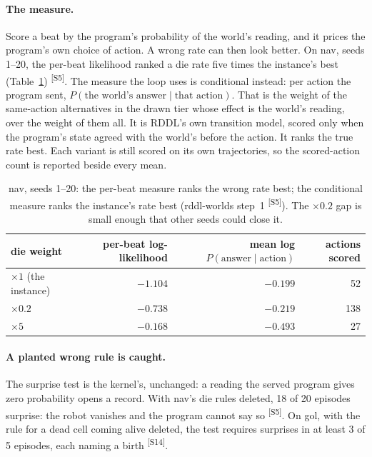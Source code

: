 \documentclass[11pt]{article}
\newcommand{\src}[1]{\textsuperscript{[#1]}}
\begin{document}
\paragraph{The measure.} Score a beat by the program's probability of
the world's reading, and it prices the program's own choice of action. A
wrong rate can then look better. On nav, seeds 1--20, the per-beat
likelihood ranked a die rate five times the instance's best (Table~\ref{tab:nav})
\src{S5}. The measure the loop uses is conditional instead: per action
the program sent, $P(\text{the world's answer} \mid \text{that action})$.
That is the weight of the same-action alternatives in the drawn tier
whose effect is the world's reading, over the weight of them all. It is
RDDL's own transition model, scored only when the program's state agreed
with the world's before the action. It ranks the true rate best. Each
variant is still scored on its own trajectories, so the scored-action
count is reported beside every mean.

\begin{table}[t]
\small\centering
\begin{tabular}{@{}lrrr@{}}
\toprule
die weight & per-beat log-likelihood & mean log $P(\text{answer}\mid\text{action})$ & actions scored \\
\midrule
$\times 1$ (the instance) & $-1.104$ & $\mathbf{-0.199}$ & 52 \\
$\times 0.2$ & $-0.738$ & $-0.219$ & 138 \\
$\times 5$ & $\mathbf{-0.168}$ & $-0.493$ & 27 \\
\bottomrule
\end{tabular}
\caption{nav, seeds 1--20: the per-beat measure ranks the wrong rate
best; the conditional measure ranks the instance's rate best
(rddl-worlds step~1 \src{S5}). The $\times 0.2$ gap is small enough that
other seeds could close it.}
\label{tab:nav}
\end{table}

\paragraph{A planted wrong rule is caught.} The surprise test is the
kernel's, unchanged: a reading the served program gives zero probability
opens a record. With nav's die rules deleted, 18 of 20 episodes surprise:
the robot vanishes and the program cannot say so \src{S5}. On gol, with
the rule for a dead cell coming alive deleted, the test requires surprises
in at least 3 of 5 episodes, each naming a birth \src{S14}.
\end{document}
